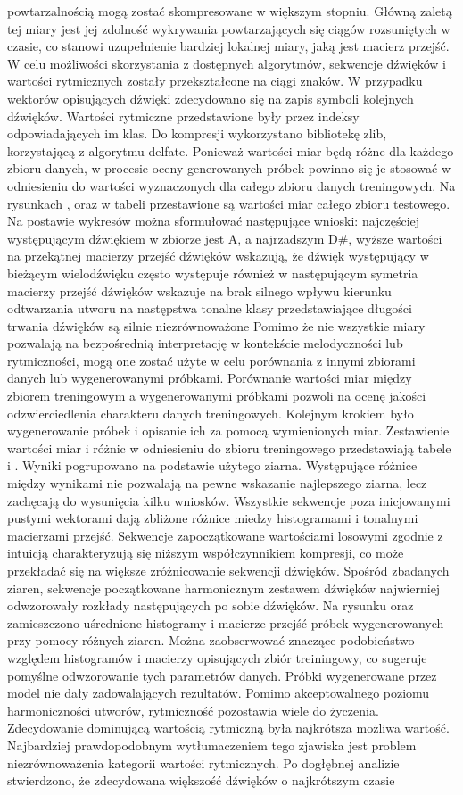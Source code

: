 powtarzalnością mogą zostać skompresowane w większym stopniu. Główną zaletą tej miary jest jej zdolność wykrywania powtarzających się ciągów rozsuniętych w czasie, co stanowi uzupełnienie  bardziej lokalnej miary, jaką jest macierz przejść. W celu możliwości skorzystania z dostępnych algorytmów, sekwencje dźwięków i wartości rytmicznych zostały przekształcone na ciągi znaków. W przypadku wektorów opisujących dźwięki zdecydowano się na zapis symboli kolejnych dźwięków. Wartości rytmiczne przedstawione były przez indeksy odpowiadających im klas.  Do kompresji wykorzystano bibliotekę zlib, korzystającą z algorytmu delfate. Ponieważ wartości miar będą różne dla każdego zbioru danych, w procesie oceny generowanych próbek powinno się je  stosować w odniesieniu do wartości wyznaczonych dla całego zbioru danych treningowych.  Na rysunkach ,  oraz w tabeli   przestawione są wartości miar całego zbioru testowego. Na postawie wykresów można sformułować następujące wnioski:  najczęściej występującym dźwiękiem w zbiorze jest A, a najrzadszym D\#,  wyższe wartości na przekątnej macierzy przejść dźwięków wskazują, że dźwięk występujący w bieżącym wielodźwięku często występuje również w następującym  symetria macierzy przejść dźwięków wskazuje na brak silnego wpływu kierunku odtwarzania utworu na następstwa tonalne  klasy przedstawiające długości trwania dźwięków są silnie niezrównoważone Pomimo że nie wszystkie miary pozwalają na bezpośrednią interpretację w kontekście melodyczności lub rytmiczności,  mogą one zostać użyte w celu porównania z innymi zbiorami danych lub wygenerowanymi próbkami.  Porównanie wartości miar między zbiorem treningowym a wygenerowanymi próbkami pozwoli na ocenę  jakości odzwierciedlenia charakteru danych treningowych. Kolejnym krokiem było wygenerowanie próbek i opisanie ich za pomocą wymienionych miar. Zestawienie wartości miar i różnic w odniesieniu do zbioru treningowego przedstawiają tabele  i . Wyniki pogrupowano na podstawie użytego ziarna. Występujące różnice między wynikami nie pozwalają na pewne wskazanie najlepszego ziarna, lecz  zachęcają do wysunięcia kilku wniosków. Wszystkie sekwencje poza inicjowanymi pustymi wektorami dają zbliżone różnice miedzy histogramami i  tonalnymi macierzami przejść.  Sekwencje zapoczątkowane wartościami losowymi zgodnie z intuicją charakteryzują się niższym współczynnikiem kompresji, co może przekładać się na większe zróżnicowanie sekwencji dźwięków. Spośród zbadanych ziaren, sekwencje początkowane harmonicznym zestawem dźwięków najwierniej odwzorowały rozkłady następujących po sobie dźwięków. Na rysunku  oraz  zamieszczono uśrednione  histogramy i macierze przejść próbek wygenerowanych przy pomocy różnych ziaren.  Można zaobserwować znaczące podobieństwo względem histogramów i macierzy opisujących zbiór treiningowy, co sugeruje pomyślne odwzorowanie tych parametrów danych. Próbki wygenerowane przez model nie dały zadowalających rezultatów. Pomimo akceptowalnego poziomu  harmoniczności utworów, rytmiczność pozostawia wiele do życzenia. Zdecydowanie dominującą wartością  rytmiczną była najkrótsza możliwa wartość. Najbardziej prawdopodobnym wytłumaczeniem tego zjawiska jest  problem niezrównoważenia kategorii wartości rytmicznych.  Po dogłębnej analizie stwierdzono, że zdecydowana większość dźwięków o najkrótszym czasie 